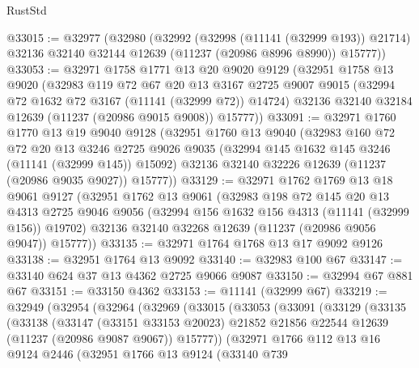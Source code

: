 \begin{lexlean}{RustStd}
\begin{coremodule}
@33015 := @32977
    (@32980
      (@32992
        (@32998 (@11141 (@32999 @193)) @21714)
        @32136
        @32140
        @32144
        @12639
        (@11237 (@20986 @8996 @8990))
        @15777))
@33053 := @32971
    @1758
    @1771
    @13
    @20
    @9020
    @9129
    (@32951
      @1758
      @13
      @9020
      (@32983
        @119
        @72
        @67
        @20
        @13
        @3167
        @2725
        @9007
        @9015
        (@32994 @72 @1632 @72 @3167 (@11141 (@32999 @72)) @14724)
        @32136
        @32140
        @32184
        @12639
        (@11237 (@20986 @9015 @9008))
        @15777))
@33091 := @32971
    @1760
    @1770
    @13
    @19
    @9040
    @9128
    (@32951
      @1760
      @13
      @9040
      (@32983
        @160
        @72
        @72
        @20
        @13
        @3246
        @2725
        @9026
        @9035
        (@32994 @145 @1632 @145 @3246 (@11141 (@32999 @145)) @15092)
        @32136
        @32140
        @32226
        @12639
        (@11237 (@20986 @9035 @9027))
        @15777))
@33129 := @32971
    @1762
    @1769
    @13
    @18
    @9061
    @9127
    (@32951
      @1762
      @13
      @9061
      (@32983
        @198
        @72
        @145
        @20
        @13
        @4313
        @2725
        @9046
        @9056
        (@32994 @156 @1632 @156 @4313 (@11141 (@32999 @156)) @19702)
        @32136
        @32140
        @32268
        @12639
        (@11237 (@20986 @9056 @9047))
        @15777))
@33135 := @32971 @1764 @1768 @13 @17 @9092 @9126
@33138 := @32951 @1764 @13 @9092
@33140 := @32983 @100 @67
@33147 := @33140 @624 @37 @13 @4362 @2725 @9066 @9087
@33150 := @32994 @67 @881 @67
@33151 := @33150 @4362
@33153 := @11141 (@32999 @67)
@33219 := @32949
    (@32954
      (@32964
        (@32969
          (@33015
            (@33053
              (@33091
                (@33129
                  (@33135
                    (@33138
                      (@33147
                        (@33151 @33153 @20023)
                        @21852
                        @21856
                        @22544
                        @12639
                        (@11237 (@20986 @9087 @9067))
                        @15777))
                    (@32971
                      @1766
                      @112
                      @13
                      @16
                      @9124
                      @2446
                      (@32951
                        @1766
                        @13
                        @9124
                        (@33140
                          @739

\end{coremodule}
\end{lexlean}
